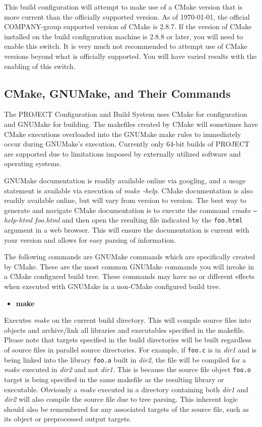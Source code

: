 \documentclass[12pt,letterpaper]{article}
\begin{document}
This build configuration will attempt to make use of a CMake version that is more current than the officially supported version.  As of \today, the official COMPANY-group supported version of CMake is 2.8.7.  If the version of CMake installed on the build configuration machine is 2.8.8 or later, you will need to enable this switch.  It is very much not recommended to attempt use of CMake versions beyond what is officially supported.  You will have varied results with the enabling of this switch.

\subsection{CMake, GNUMake, and Their Commands}

The PROJECT Configuration and Build System uses CMake for configuration and GNUMake for building.  The makefiles created by CMake will sometimes have CMake executions overloaded into the GNUMake make rules to immediately occur during GNUMake's execution.  Currently only 64-bit builds of PROJECT are supported due to limitations imposed by externally utilized software and operating systems.

GNUMake documentation is readily available online via googling, and a usage statement is available via execution of \emph{make -help}.  \hypertarget{cmakedoc}{}CMake documentation is also readily available online, but will vary from version to version.  The best way to generate and navigate CMake documentation is to execute the command \emph{cmake \texttt{--}help-html foo.html} and then open the resulting file indicated by the \verb|foo.html| argument in a web browser.  This will ensure the documentation is current with your version and allows for easy parsing of information.

The following commands are GNUMake commands which are specifically created by CMake.  These are the most common GNUMake commands you will invoke in a CMake configured build tree.  These commands may have no or different effects when executed with GNUMake in a non-CMake configured build tree.

\begin{itemize}
\item \textbf{make}
\end{itemize}

Executes \emph{make} on the current build directory.  This will compile source files into objects and archive/link all libraries and executables specified in the makefile.  Please note that targets specified in the build directories will be built regardless of source files in parallel source directories.  For example, if \verb|foo.c| is in \emph{dir1} and is being linked into the library \verb|foo.a| built in \emph{dir2}, the file will be compiled for a \emph{make} executed in \emph{dir2} and not \emph{dir1}.  This is because the source file object \verb|foo.o| target is being specified in the same makefile as the resulting library or executable.  Obviously a \emph{make} executed in a directory containing both \emph{dir1} and \emph{dir2} will also compile the source file due to tree parsing.  This inherent logic should also be remembered for any associated targets of the source file, such as its object or preprocessed output targets.
\end{document}
